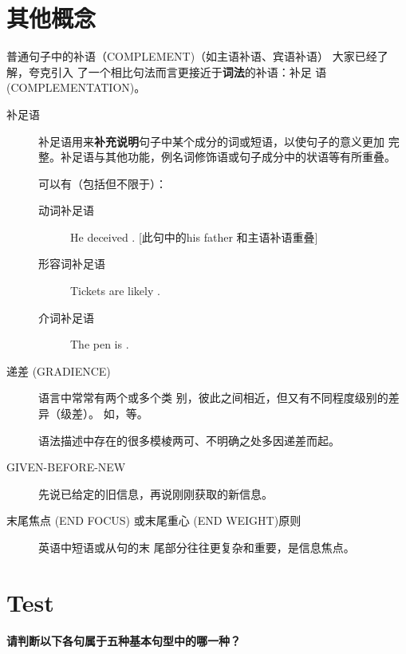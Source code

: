 \section{其他概念}

普通句子中的补语（COMPLEMENT)（如主语补语、宾语补语） 大家已经了解，夸克引入
了一个相比句法而言更接近于\textbf{词法}的补语：补足
语 (COMPLEMENTATION)。
\begin{description}
\item[补足语] 补足语用来\textbf{补充说明}句子中某个成分的词或短语，以使句子的意义更加
  完整。补足语与其他功能，例名词修饰语或句子成分中的状语等有所重叠。

  可以有（包括但不限于）：
  \begin{description}
  \item[动词补足语] He deceived . [此句中的his father 和主语补语重叠]

  \item[形容词补足语] Tickets are likely .

  \item[介词补足语] The pen is .
  \end{description}

\item[递差 (GRADIENCE)]  语言中常常有两个或多个类
  别，彼此之间相近，但又有不同程度级别的差异（级差）。
  如，等。

  语法描述中存在的很多模棱两可、不明确之处多因递差而起。

\item[GIVEN-BEFORE-NEW] 先说已给定的旧信息，再说刚刚获取的新信息。

\item[末尾焦点 (END FOCUS) 或末尾重心 (END WEIGHT)原则] 英语中短语或从句的末
  尾部分往往更复杂和重要，是信息焦点。

\end{description}

\section{Test}

\textbf{请判断以下各句属于五种基本句型中的哪一种？}

